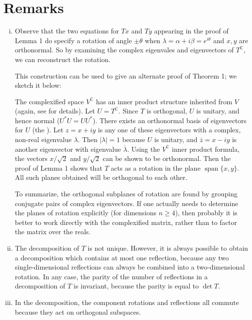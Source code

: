 \documentclass[12pt]{article}
\newcommand{\Vc}{V^\mathbb{C}}
\newcommand{\Tc}{T^\mathbb{C}}
\providecommand{\abs}[1]{\lvert#1\rvert}
\DeclareMathOperator{\linspan}{span}
\begin{document}
\section{Remarks}
\begin{enumerate}[i.]
\item
Observe that the two equations for $Tx$ and $Ty$ appearing in the proof of Lemma 1
do specify a rotation of angle $\pm \theta$ when $\lambda = \alpha + i\beta = e^{i\theta}$
and $x, y$ are orthonormal.
So by examining the complex eigenvales and eigenvectors of $\Tc$,
we can reconstruct the rotation.

This construction can be used to give an alternate proof of Theorem 1; we sketch it below:

The complexified space $\Vc$ has an inner product structure inherited from $V$ (again, see 
 for details).
Let $U = \Tc$.  Since $T$ is orthogonal, $U$ is unitary, and hence normal ($U^* U = UU^*$).
There exists an orthonormal basis of eigenvectors for $U$ (the ).
Let $z = x+iy$ is any one of these eigenvectors with a complex, non-real eigenvalue
$\lambda$.  Then $\abs{\lambda} = 1$ because $U$ is unitary,
and $\overline{z} = x-iy$ is another eigenvector with eigenvalue $\overline{\lambda}$.
Using the $\Vc$ inner product formula, the vectors $x/\sqrt{2}$ and $y/\sqrt{2}$ can be shown to be orthonormal.
Then the proof of Lemma 1 shows that $T$ acts as a rotation in the plane $\linspan \{ x, y \}$.
All such planes obtained will be orthogonal to each other.

To summarize, the orthogonal subplanes of rotation are found by grouping conjugate pairs
of complex eigenvectors. If one actually needs to determine the planes of rotation explicitly (for dimensions $n \geq 4$), then probably it is better to work directly with the complexified matrix,
rather than to factor the matrix over the reals.

\item
The decomposition of $T$ is not unique.  However, it is always possible to obtain
a decomposition which contains at most one reflection,
because any two single-dimensional reflections can always be combined into
a two-dimensional rotation.
In any case, the parity of the number of reflections in a decomposition of $T$ is invariant,
because the parity is equal to $\det T$.

\item
In the decomposition, the component rotations and reflections all commute
because they act on orthogonal subspaces.


\end{enumerate}
\end{document}
